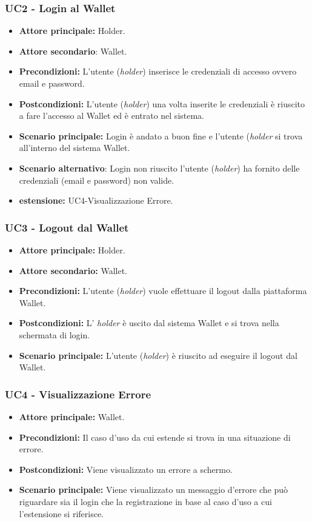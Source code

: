 \subsubsection{UC2 - Login al Wallet}
\begin{itemize}
\item \textbf{Attore principale:} Holder.
\item \textbf{Attore secondario}: Wallet. 
\item \textbf{Precondizioni:} L'utente (\textit{holder}) inserisce le credenziali di accesso ovvero email e password.
\item \textbf{Postcondizioni:} L'utente (\textit{holder}) una volta inserite le credenziali è riuscito a fare l'accesso al Wallet ed è entrato nel sistema.
\item \textbf{Scenario principale:} Login è andato a buon fine e l'utente  (\textit{holder} si trova all'interno del sistema Wallet.
\item \textbf{Scenario alternativo}: Login non riuscito l'utente (\textit{holder}) ha fornito delle credenziali (email e password) non valide.
\item \textbf{estensione:} UC4-Visualizzazione Errore.
\end{itemize}

\subsubsection{UC3 - Logout dal Wallet}
\begin{itemize}
\item \textbf{Attore principale:} Holder.
\item \textbf{Attore secondario:} Wallet.
\item \textbf{Precondizioni:} L'utente (\textit{holder}) vuole effettuare il logout dalla piattaforma Wallet.
\item \textbf{Postcondizioni:} L' \textit{holder} è uscito dal sistema Wallet e si trova nella schermata di login.
\item \textbf{Scenario principale:} L'utente (\textit{holder}) è riuscito ad eseguire il logout dal Wallet. 
\end{itemize}

\subsubsection{UC4 - Visualizzazione Errore}
\begin{itemize}
\item \textbf{Attore principale:} Wallet.
\item \textbf{Precondizioni:} Il caso d'uso da cui estende si trova in una situazione di errore.
\item \textbf{Postcondizioni:} Viene visualizzato un errore a schermo. 
\item \textbf{Scenario principale:} Viene visualizzato un messaggio d’errore che può riguardare sia il login che la registrazione in base al caso d’uso a cui l’estensione si riferisce.
\end{itemize}

